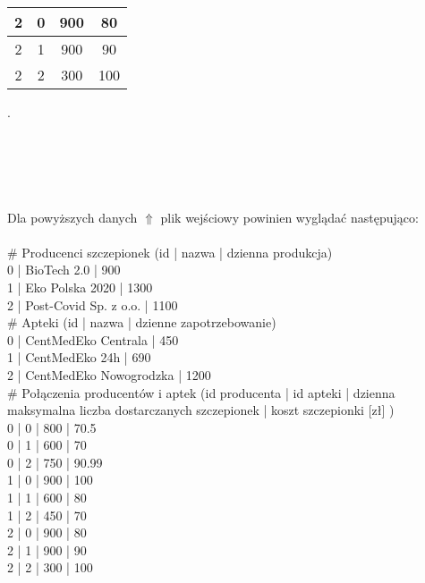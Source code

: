 \documentclass[]{article}
\begin{document}
\begin{table}[h!]
{\begin{tabular}{|c|c|c|c|}
2                      & 0                                          & 900                                                          & 80                                  \\ \hline
2                      & 1                                          & 900                                                          & 90                                  \\ \hline
2                      & 2                                          & 300                                                          & 100                                 \\ \hline
\end{tabular}
}
\end{table}
.\\\\\\\\\\\\
 Dla powyższych danych $\Uparrow$  plik wejściowy powinien wyglądać następująco:\\\\
\# Producenci szczepionek (id | nazwa | dzienna produkcja)\\
0 | BioTech 2.0 | 900\\
1 | Eko Polska 2020 | 1300\\
2 | Post-Covid Sp. z o.o. | 1100\\
\# Apteki (id | nazwa | dzienne zapotrzebowanie)\\
0 | CentMedEko Centrala | 450\\
1 | CentMedEko 24h | 690\\
2 | CentMedEko Nowogrodzka | 1200\\
\# Połączenia producentów i aptek (id producenta | id apteki | dzienna maksymalna liczba dostarczanych szczepionek | koszt szczepionki [zł] )\\
0 | 0 | 800 | 70.5\\
0 | 1 | 600 | 70\\
0 | 2 | 750 | 90.99\\
1 | 0 | 900 | 100\\
1 | 1 | 600 | 80\\
1 | 2 | 450 | 70\\
2 | 0 | 900 | 80\\
2 | 1 | 900 | 90\\
2 | 2 | 300 | 100\\
\end{document}
